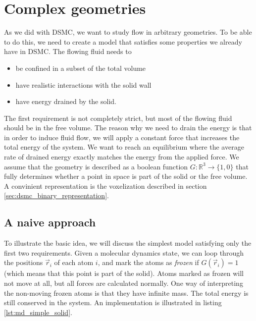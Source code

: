 \section{Complex geometries}
\label{sec:md_complex_geometries}
As we did with DSMC, we want to study flow in arbitrary geometries.  To be able to do this, we need to create a model that satisfies some properties we already have in DSMC. The flowing fluid needs to
\begin{itemize}
	\item be confined in a subset of the total volume
	\item have realistic interactions with the solid wall
	\item have energy drained by the solid.
\end{itemize}
The first requirement is not completely strict, but most of the flowing fluid should be in the free volume. The reason why we need to drain the energy is that in order to induce fluid flow, we will apply a constant force that increases the total energy of the system. We want to reach an equilibrium where the average rate of drained energy exactly matches the energy from the applied force. We assume that the geometry is described as a boolean function $G : \mathbb{R}^3\rightarrow \{1,0\}$ that fully determines whether a point in space is part of the solid or the free volume. A convinient representation is the voxelization described in section \ref{sec:dsmc_binary_representation}. 
\subsection{A naive approach}
To illustrate the basic idea, we will discuss the simplest model satisfying only the first two requirements. Given a molecular dynamics state, we can loop through the positions $\vec r_i$ of each atom $i$, and mark the atoms as \textit{frozen} if $G(\vec r_i) = 1$ (which means that this point is part of the solid). Atoms marked as frozen will not move at all, but all forces are calculated normally. One way of interpreting the non-moving frozen atoms is that they have infinite mass. The total energy is still conserved in the system. An implementation is illustrated in listing \ref{lst:md_simple_solid}.

